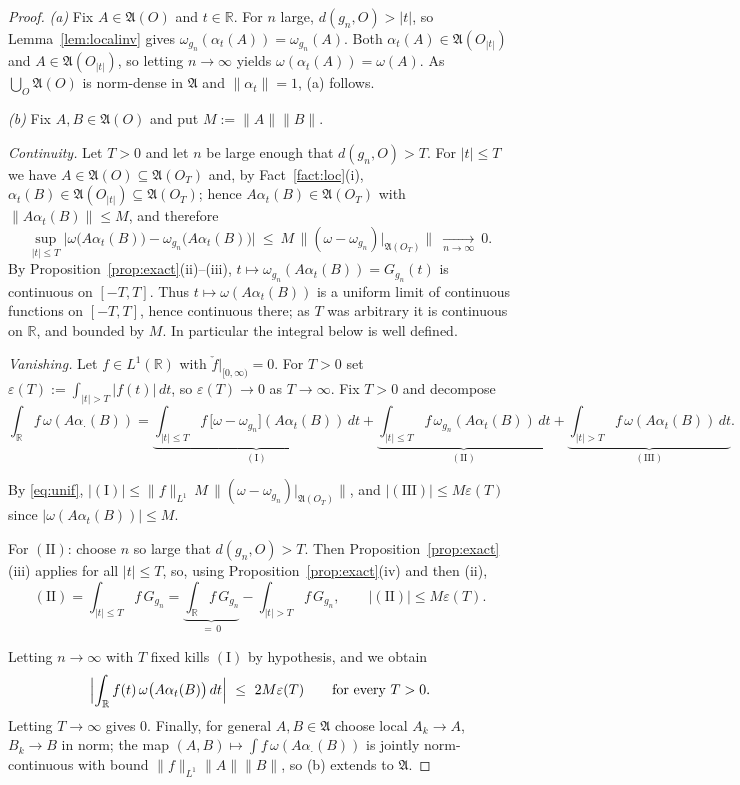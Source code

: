 \documentclass[11pt,a4paper]{article}
\theoremstyle{plain}
\theoremstyle{definition}
\newcommand{\A}{\mathfrak{A}}
\newcommand{\R}{\mathbb{R}}
\begin{document}
\begin{proof}
\emph{(a)} Fix $A\in\A(O)$ and $t\in\R$. For $n$ large, $d(g_n,O)>|t|$, so
Lemma~\ref{lem:localinv} gives $\omega_{g_n}(\alpha_t(A))=\omega_{g_n}(A)$. Both
$\alpha_t(A)\in\A(O_{|t|})$ and $A\in\A(O_{|t|})$, so letting $n\to\infty$ yields
$\omega(\alpha_t(A))=\omega(A)$. As $\bigcup_O\A(O)$ is norm-dense in $\A$ and $\|\alpha_t\|=1$,
(a) follows.

\emph{(b)} Fix $A,B\in\A(O)$ and put $M:=\|A\|\|B\|$.

\emph{Continuity.} Let $T>0$ and let $n$ be large enough that $d(g_n,O)>T$. For $|t|\le T$ we
have $A\in\A(O)\subseteq\A(O_T)$ and, by Fact~\ref{fact:loc}(i),
$\alpha_t(B)\in\A(O_{|t|})\subseteq\A(O_T)$; hence $A\alpha_t(B)\in\A(O_T)$ with
$\|A\alpha_t(B)\|\le M$, and therefore
\begin{equation}\label{eq:unif}
  \sup_{|t|\le T}\bigl|\omega\bigl(A\alpha_t(B)\bigr)-\omega_{g_n}\bigl(A\alpha_t(B)\bigr)\bigr|
  \ \le\ M\,\bigl\|(\omega-\omega_{g_n})|_{\A(O_T)}\bigr\|\ \xrightarrow[n\to\infty]{}\ 0 .
\end{equation}
By Proposition~\ref{prop:exact}(ii)--(iii), $t\mapsto\omega_{g_n}(A\alpha_t(B))=G_{g_n}(t)$ is
continuous on $[-T,T]$. Thus $t\mapsto\omega(A\alpha_t(B))$ is a uniform limit of continuous
functions on $[-T,T]$, hence continuous there; as $T$ was arbitrary it is continuous on $\R$, and
bounded by $M$. In particular the integral below is well defined.

\emph{Vanishing.} Let $f\in L^1(\R)$ with $\check f|_{[0,\infty)}=0$. For $T>0$ set
$\varepsilon(T):=\int_{|t|>T}|f(t)|\,dt$, so $\varepsilon(T)\to0$ as $T\to\infty$. Fix $T>0$ and
decompose
\[
  \int_\R f\,\omega(A\alpha_\cdot(B))
  =\underbrace{\int_{|t|\le T} f\,\bigl[\omega-\omega_{g_n}\bigr](A\alpha_t(B))\,dt}_{(\mathrm I)}
  +\underbrace{\int_{|t|\le T} f\,\omega_{g_n}(A\alpha_t(B))\,dt}_{(\mathrm{II})}
  +\underbrace{\int_{|t|> T} f\,\omega(A\alpha_t(B))\,dt}_{(\mathrm{III})}.
\]

By \eqref{eq:unif},
$|(\mathrm I)|\le\|f\|_{L^1}\,M\,\|(\omega-\omega_{g_n})|_{\A(O_T)}\|$,
and $|(\mathrm{III})|\le M\varepsilon(T)$ since $|\omega(A\alpha_t(B))|\le M$.

For $(\mathrm{II})$: choose $n$ so large that $d(g_n,O)>T$. Then
Proposition~\ref{prop:exact}(iii) applies for all $|t|\le T$, so, using
Proposition~\ref{prop:exact}(iv) and then (ii),
\[
  (\mathrm{II})=\int_{|t|\le T} f\,G_{g_n}
  =\underbrace{\int_\R f\,G_{g_n}}_{=\,0}-\int_{|t|>T} f\,G_{g_n},
  \qquad |(\mathrm{II})|\le M\varepsilon(T).
\]

Letting $n\to\infty$ with $T$ fixed kills $(\mathrm I)$ by hypothesis, and we obtain
\[
  \Bigl|\int_\R f(t)\,\omega\bigl(A\alpha_t(B)\bigr)\,dt\Bigr|\ \le\ 2M\varepsilon(T)
  \qquad\text{for every }T>0 .
\]
Letting $T\to\infty$ gives $0$. Finally, for general $A,B\in\A$ choose local
$A_k\to A$, $B_k\to B$ in norm; the map $(A,B)\mapsto\int f\,\omega(A\alpha_\cdot(B))$ is
jointly norm-continuous with bound $\|f\|_{L^1}\|A\|\|B\|$, so (b) extends to $\A$.
\end{proof}
\end{document}
